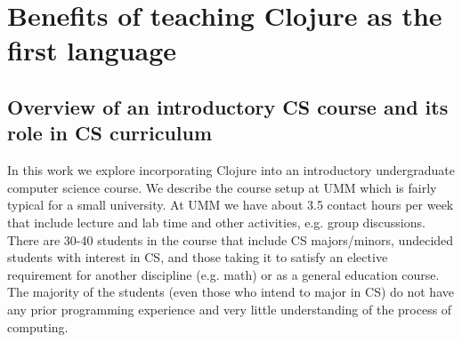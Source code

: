 \documentclass[submission,copyright,creativecommons]{eptcs}
\newcommand{\allcomments}[1]{{#1}}
\newcommand{\elenacomment}[1]{{\bf \textcolor{ForestGreen}{\allcomments{{#1}}}}}
\newcommand{\stephencomment}[1]{{\bf \color{StephensBlue}{\allcomments{{#1}}}}} %
\newcommand{\joecomment}[1]{{\bf \color{JoesGold}{\allcomments{{#1}}}}}
\begin{document}
\section{Benefits of teaching Clojure as the first language}

\subsection{Overview of an introductory CS course and its role in CS curriculum}
In this work we explore incorporating Clojure into an introductory undergraduate computer science course. We describe the course setup at UMM which is fairly typical for a small university. At UMM we have about 3.5 contact hours per week that include lecture and lab time and other activities, e.g. group discussions. There are 30-40 students in the course that  include CS majors/minors, undecided students with  interest in CS, and those taking it to satisfy an elective requirement for another discipline (e.g. math) or as a general education course. The majority of the students (even those who intend to major in CS) do not have any prior programming experience and very little understanding of the process of computing. 
\end{document}
